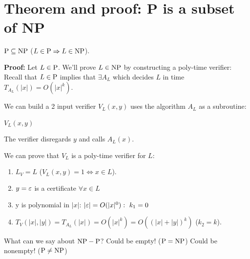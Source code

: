 
\section{Theorem and proof: P is a subset of NP} 
\begin{notestheorem}
$\mathrm{P}\subseteq\mathrm{NP}$ ($L\in\mathrm{P}\Rightarrow L\in\mathrm{NP}$).
\end{notestheorem}

\textbf{Proof:} Let $L\in\mathrm{P}$. We'll prove $L\in\mathrm{NP}$ by constructing a poly-time verifier:
Recall that $L\in\mathrm{P}$ implies that $\exists A_L$ which decides $L$ in time $T_{A_L}(|x|)=O(|x|^k)$.

We can build a 2 input verifier $V_L(x,y)$ uses the algorithm $A_L$ as a subroutine:


\begin{notesalgorithm}
$V_L(x,y)   $
\begin{notespseudocode}


\end{notespseudocode}
\end{notesalgorithm}


The verifier disregards $y$ and calls $A_L(x)$.

We can prove that $V_L$ is a poly-time verifier for $L$:

\begin{enumerate}
\item $L_V=L$ ($V_L(x,y)=1\Longleftrightarrow x\in L$).
\item $y=\varepsilon$ is a certificate $\forall x\in L$ 
\item y is polynomial in $|x|$: $|\varepsilon|=O(|x|^0):\ k_1=0$
\item $T_V(|x|,|y|)=T_{A_L}(|x|)=O(|x|^k)=O((|x|+|y|)^k)$ ($k_2=k$).
\end{enumerate}
What can we say about $\mathrm{NP}-\mathrm{P}$?
Could be empty! ($\mathrm{P}=\mathrm{NP}$)
Could be nonempty! ($\mathrm{P}\neq\mathrm{NP}$)
